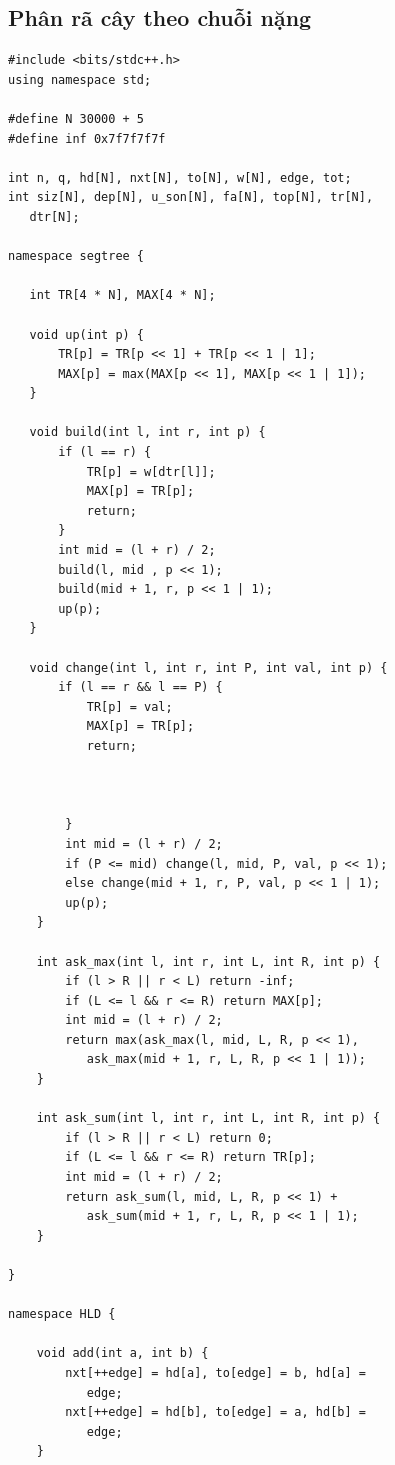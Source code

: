 \documentclass[11pt]{article}
\begin{document}
\subsection{Phân rã cây theo chuỗi nặng}

\begingroup
\footnotesize
\begin{verbatim}
#include <bits/stdc++.h>
using namespace std;

#define N 30000 + 5
#define inf 0x7f7f7f7f

int n, q, hd[N], nxt[N], to[N], w[N], edge, tot;
int siz[N], dep[N], u_son[N], fa[N], top[N], tr[N],
   dtr[N];

namespace segtree {

   int TR[4 * N], MAX[4 * N];

   void up(int p) {
       TR[p] = TR[p << 1] + TR[p << 1 | 1];
       MAX[p] = max(MAX[p << 1], MAX[p << 1 | 1]);
   }

   void build(int l, int r, int p) {
       if (l == r) {
           TR[p] = w[dtr[l]];
           MAX[p] = TR[p];
           return;
       }
       int mid = (l + r) / 2;
       build(l, mid , p << 1);
       build(mid + 1, r, p << 1 | 1);
       up(p);
   }

   void change(int l, int r, int P, int val, int p) {
       if (l == r && l == P) {
           TR[p] = val;
           MAX[p] = TR[p];
           return;



        }
        int mid = (l + r) / 2;
        if (P <= mid) change(l, mid, P, val, p << 1);
        else change(mid + 1, r, P, val, p << 1 | 1);
        up(p);
    }

    int ask_max(int l, int r, int L, int R, int p) {
        if (l > R || r < L) return -inf;
        if (L <= l && r <= R) return MAX[p];
        int mid = (l + r) / 2;
        return max(ask_max(l, mid, L, R, p << 1),
           ask_max(mid + 1, r, L, R, p << 1 | 1));
    }

    int ask_sum(int l, int r, int L, int R, int p) {
        if (l > R || r < L) return 0;
        if (L <= l && r <= R) return TR[p];
        int mid = (l + r) / 2;
        return ask_sum(l, mid, L, R, p << 1) +
           ask_sum(mid + 1, r, L, R, p << 1 | 1);
    }

}

namespace HLD {

    void add(int a, int b) {
        nxt[++edge] = hd[a], to[edge] = b, hd[a] =
           edge;
        nxt[++edge] = hd[b], to[edge] = a, hd[b] =
           edge;
    }


\end{verbatim}
\end{document}
